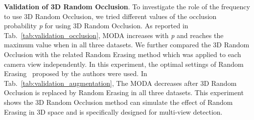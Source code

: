 \documentclass[runningheads]{llncs}
\begin{document}
	
	\begin{table}[b]
		\begin{center}
			\caption{Validation of the occlusion probability (with 5-layer projection applied).}
			\label{tab:validation_occlusion}
		\end{center}
	\end{table}
	
	\textbf{Validation of 3D Random Occlusion}. To investigate the role of the frequency to use 3D Random Occlusion, we tried different values of the occlusion probability \textit{p} for using 3D Random Occlusion. As reported in Tab.~\ref{tab:validation_occlusion}, MODA increases with \textit{p} and reaches the maximum value when  in all three datasets. We further compared the 3D Random Occlusion with the related Random Erasing method which was applied to each camera view independently. In this experiment, the optimal settings of Random Erasing~\cite{zhong2020random} proposed by the authors were used. In Tab.~\ref{tab:validation_augmentation}, The MODA decreases after 3D Random Occlusion is replaced by Random Erasing in all three datasets. This experiment shows the 3D Random Occlusion method can simulate the effect of Random Erasing in 3D space and is specifically designed for multi-view detection.
	
\end{document}
